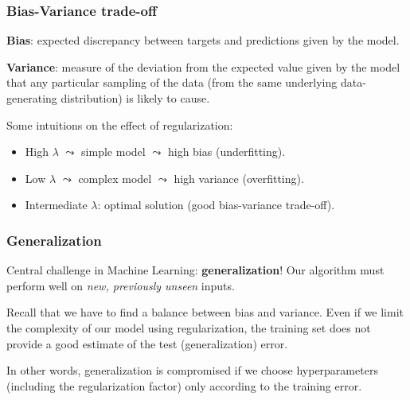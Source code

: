\documentclass{beamer}
\begin{document}
\begin{frame}
	\frametitle{Bias-Variance trade-off}
	\textbf{Bias}: expected discrepancy between targets and predictions given by the model.
	
	\vspace{5mm}
	
	\textbf{Variance}: measure of the deviation from the expected value given by the model that any particular sampling of the data (from the same underlying data-generating distribution) is likely to cause.
	
	\vspace{5mm}
	
	Some intuitions on the effect of regularization:
	\begin{itemize}
		\item High $\lambda$ $\leadsto$ simple model $\leadsto$ high bias (underfitting).
		\item Low $\lambda$ $\leadsto$  complex model $\leadsto$  high variance (overfitting).
		\item Intermediate $\lambda$: optimal solution (good bias-variance trade-off).
	\end{itemize}
\end{frame}
	
	\begin{frame}
		\frametitle{Generalization}
		Central challenge in Machine Learning: \textbf{generalization}! Our algorithm must perform well on \textit{new, previously unseen} inputs.
		
		\vspace{5mm}
		
		Recall that we have to find a balance between bias and variance. Even if we limit the complexity of our model using regularization, the training set does not provide a good estimate of the test (generalization) error.
		
		\vspace{5mm}
		
		In other words, generalization is compromised if we choose hyperparameters (including the regularization factor) only according to the training error.
	\end{frame}
\end{document}
